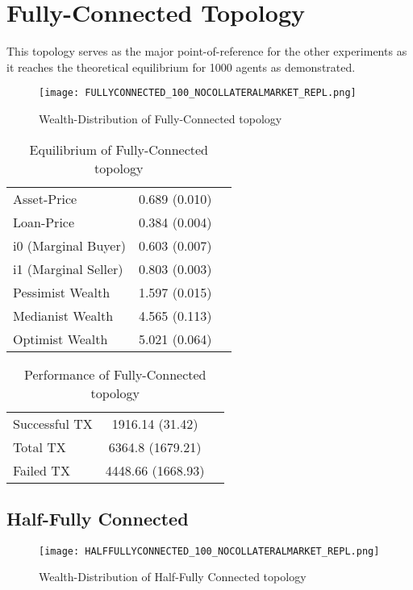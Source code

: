 \documentclass[Bachelorarbeit.tex]{subfiles}
\begin{document}
\section{Fully-Connected Topology}
This topology serves as the major point-of-reference for the other experiments as it reaches the theoretical equilibrium for 1000 agents as demonstrated.


\begin{figure}[H]
	\centering
  \texttt{[image: FULLYCONNECTED\_100\_NOCOLLATERALMARKET\_REPL.png]}
	\caption{Wealth-Distribution of Fully-Connected topology}
	\label{fig1}
\end{figure}

\begin{table}[h]
	\caption{Equilibrium of Fully-Connected topology}
	\centering
	\begin{tabular} { l c r }
		\hline
		Asset-Price & 0.689 (0.010) \\
		Loan-Price & 0.384 (0.004) \\
		i0 (Marginal Buyer) & 0.603 (0.007) \\
		i1 (Marginal Seller) & 0.803 (0.003) \\
		Pessimist Wealth & 1.597 (0.015) \\
		Medianist Wealth & 4.565 (0.113) \\
		Optimist Wealth & 5.021 (0.064) \\
		\hline
	\end{tabular}
\end{table} 

\begin{table}[h]
	\caption{Performance of Fully-Connected topology}
	\centering
	\begin{tabular} { l c r }
		\hline
		Successful TX & 1916.14 (31.42) \\
		Total TX & 6364.8 (1679.21) \\
		Failed TX & 4448.66 (1668.93) \\
		\hline
	\end{tabular}
\end{table}

\subsection{Half-Fully Connected}
\begin{figure}[H]
	\centering
  \texttt{[image: HALFFULLYCONNECTED\_100\_NOCOLLATERALMARKET\_REPL.png]}
	\caption{Wealth-Distribution of Half-Fully Connected topology }
	\label{fig1}
\end{figure}
\end{document}
